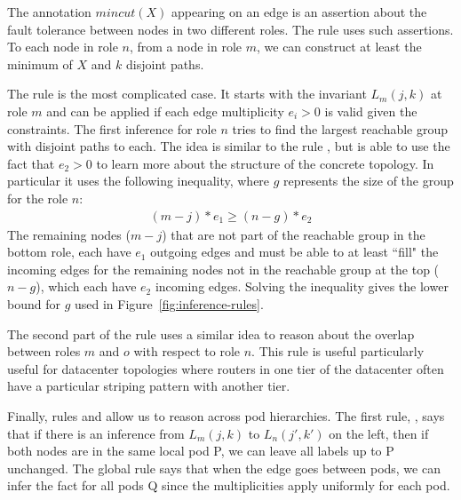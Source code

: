 \documentclass[numbers, 10pt, preprint]{sigplanconf}
\begin{document}
The annotation $mincut(X)$ appearing on an edge is an assertion about the fault tolerance between nodes in two different roles. The rule  uses such assertions. To each node in role $n$, from a node in role $m$, we can construct at least the minimum of $X$ and $k$ disjoint paths.


The rule  is the most complicated case.
It starts with the invariant $L_m(j,k)$ at role $m$ and can be applied if each edge multiplicity $e_i > 0$ is valid given the constraints. The first inference for role $n$ tries to find the largest reachable group with disjoint paths to each. The idea is similar to the rule , but is able to use the fact that $e_2 > 0$ to learn more about the structure of the concrete topology. In particular it uses the following inequality, where $g$ represents the size of the group for the role $n$:
%
\[ \begin{array}{c}
  (m-j)*e_1 \geq (n-g)*e_2
\end{array} \]
\noindent
%
The remaining nodes ($m-j$) that are not part of the reachable group in the bottom role, each have $e_1$ outgoing edges and must be able to at least ``fill" the incoming edges for the remaining nodes not in the reachable group at the top ($n-g$), which each have $e_2$ incoming edges. Solving the inequality gives the lower bound for $g$ used in Figure~\ref{fig:inference-rules}.

The second part of the rule uses a similar idea to reason about the overlap between roles $m$ and $o$ with respect to role $n$. This rule is useful particularly useful for datacenter topologies where routers in one tier of the datacenter often have a particular striping pattern with another tier.

Finally, rules  and  allow us to reason across pod hierarchies. The first rule, , says that if there is an inference from $L_m(j,k)$ to $L_n(j',k')$ on the left, then if both nodes are in the same local pod P, we can leave all labels up to P unchanged. The global rule  says that when the edge goes between pods, we can infer the fact for all pods Q since the multiplicities apply uniformly for each pod.
\end{document}
